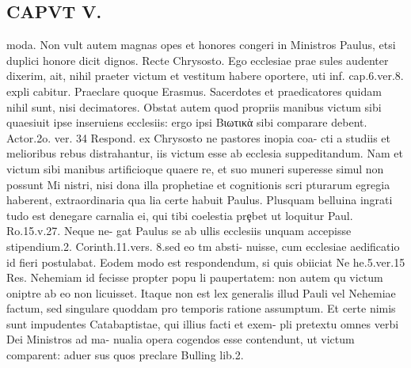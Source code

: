 \documentclass{article}
\begin{document}
\begin{pages}
\section*{CAPVT  V. }
\marginpar{[ p.307 ]}moda. Non vult autem magnas opes et honores congeri in Ministros Paulus, etsi duplici honore dicit dignos. Recte Chrysosto. Ego ecclesiae prae sules audenter dixerim, ait, nihil praeter victum et vestitum habere oportere, uti inf. cap.6.ver.8. expli cabitur. Praeclare quoque Erasmus. Sacerdotes et praedicatores quidam nihil sunt, nisi decimatores. Obstat autem quod propriis manibus victum sibi quaesiuit ipse inseruiens ecclesiis: ergo ipsi Βιωτικὰ sibi comparare debent. Actor.2o. ver. 34 Respond. ex Chrysosto ne pastores inopia coa- cti a studiis et melioribus rebus distrahantur, iis victum esse ab ecclesia suppeditandum. Nam et victum sibi manibus artificioque quaere re, et suo muneri superesse simul non possunt Mi nistri, nisi dona illa prophetiae et cognitionis scri pturarum egregia haberent, extraordinaria qua lia certe habuit Paulus. Plusquam belluina ingrati tudo est denegare carnalia ei, qui tibi coelestia prȩbet ut loquitur Paul. Ro.15.v.27. Neque ne- gat Paulus se ab ullis ecclesiis unquam accepisse stipendium.2. Corinth.11.vers. 8.sed eo tm absti- nuisse, cum ecclesiae aedificatio id fieri postulabat. Eodem modo est respondendum, si quis obiiciat Ne he.5.ver.15 Res. Nehemiam id fecisse propter popu li paupertatem: non autem qu victum oniptre ab eo non licuisset. Itaque non est lex generalis illud Pauli vel Nehemiae factum, sed singulare quoddam pro temporis ratione assumptum. Et certe nimis sunt impudentes Catabaptistae, qui illius facti et exem- pli pretextu omnes verbi Dei Ministros ad ma- nualia opera cogendos esse contendunt, ut victum comparent: aduer sus quos preclare Bulling lib.2. 

\end{pages}
\end{document}
